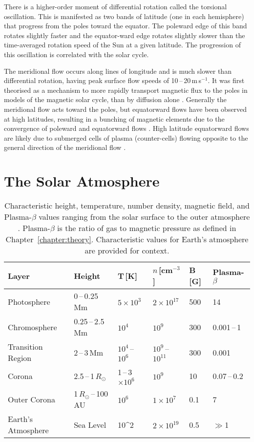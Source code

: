 There is a higher-order moment of differential rotation called the torsional oscillation. This is manifested as two bands of latitude (one in each hemisphere) that progress from the poles toward the equator. The poleward edge of this band rotates slightly faster and the equator-ward edge rotates slightly slower than the time-averaged rotation speed of the Sun at a given latitude. The progression of this oscillation is correlated with the solar cycle. 

The meridional flow occurs along lines of longitude and is much slower than differential rotation, having peak surface flow speeds of 10\,--\,20\,m\,s$^{-1}$. It was first theorised as a mechanism to more rapidly transport magnetic flux to the poles in models of the magnetic solar cycle, than by diffusion alone \citep{Mosher:1977,Sheeley:2005}. Generally the meridional flow acts toward the poles, but equatorward flows have been observed at high latitudes, resulting in a bunching of magnetic elements due to the convergence of poleward and equatorward flows \citep{Ulrich:2005}. High latitude equatorward flows are likely due to submerged cells of plasma (counter-cells) flowing opposite to the general direction of the meridional flow \citep{Haber:2002}. 

\section{The Solar Atmosphere}\label{intro:atmosphere}

\begin{table}%
\caption[Characteristic property values for the solar surface and atmosphere.]{Characteristic height, temperature, number density, magnetic field, and Plasma-$\beta$ values ranging from the solar surface to the outer atmosphere \citep{Aschwanden:2005, Goossens:2003, Gary:2001}. Plasma-$\beta$ is the ratio of gas to magnetic pressure as defined in Chapter~\ref{chapter:theory}. Characteristic values for Earth's atmosphere are provided for context.}
\label{table:atmoscharprop}
\begin{tabular}{llllll}     %
  \hline                   %
  \hline
Layer & Height & T\,[K] & $n$\,[cm$^{-3}$] & B\,[G] & Plasma-$\beta$ \\
  \hline
Photosphere & 0\,--\,0.25\,Mm & $5\times10^3$  & $2\times10^{17}$ & 500 & 14 \\
Chromosphere & 0.25\,--\,2.5\,Mm & $10^4$  & $10^9$ & 300 & 0.001\,--\,1 \\
Transition Region & 2\,--\,3\,Mm & $10^4$\,--\,$10^6$ & $10^9$\,--\,$10^{11}$ & 300 & 0.001 \\
Corona & 2.5\,--\,1\,$R_{\odot}$ & 1\,--\,3$\times10^6$  & $10^9$ & 10 & 0.07\,--\,0.2 \\
Outer Corona & 1\,$R_{\odot}$\,--\,100\,AU & $10^6$ & $1\times10^7$ & 0.1 & 7 \\
Earth's Atmosphere & Sea Level & 10^2 & $2\times10^{19}$ & 0.5 & $\gg$1 \\
\hline
\end{tabular}
\end{table}


